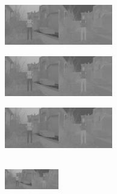 \documentclass{article}
\begin{document}
\begin{center}

    \noindent
    \begin{minipage}[t]{0.25\textwidth}
        \centering
        \includegraphics[width=4.7cm,height=1.76cm]{cbcr.png}
    \end{minipage}
    \hspace{.24cm}
    \begin{minipage}[t]{0.2\textwidth}
        \centering
        \vspace{-1.3cm}
    \end{minipage}
    \begin{minipage}[t]{0.25\textwidth}
        \centering
        \includegraphics[width=4.7cm,height=1.76cm]{cbcr.png}
    \end{minipage}
    
    \vspace{.6cm}
    
    \noindent
    \begin{minipage}[t]{0.25\textwidth}
        \centering
        \includegraphics[width=4.7cm,height=1.76cm]{cbcr.png}
    \end{minipage}
    \hspace{.24cm}
    \begin{minipage}[t]{0.2\textwidth}
        \centering
        \vspace{-1.3cm}
    \end{minipage}
    \begin{minipage}[t]{0.25\textwidth}
        \centering
        \includegraphics[width=2.35cm,height=1.76cm]{cbcr.png}
    \end{minipage}
    

\end{center}
\end{document}

